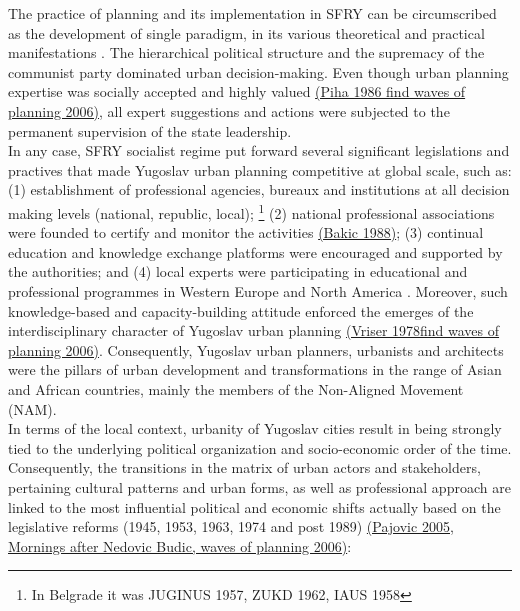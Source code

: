 \documentclass[11pt]{report}
\begin{document}
The practice of planning and its implementation in SFRY can be circumscribed as the development of single paradigm, in its various theoretical and practical manifestations \href{}{\citealt{vukmirovic_city_2013}}.
The hierarchical political structure and the supremacy of the communist party dominated urban decision-making.
Even though urban planning expertise was socially accepted and highly valued \href{}{(Piha 1986 find waves of planning 2006)}, all expert suggestions and actions were subjected to the permanent supervision of the state leadership.
\\
In any case, SFRY socialist regime put forward several significant legislations and practives that made Yugoslav urban planning competitive at global scale, such as: 
(1) establishment of professional agencies, bureaux and institutions at all decision making levels (national, republic, local);
\footnote{In Belgrade it was JUGINUS 1957, ZUKD 1962, IAUS 1958} (2) national professional associations were founded to certify and monitor the activities \href{}{(Bakic 1988)}; (3) continual education and knowledge exchange platforms were encouraged and supported by the authorities; and (4) local experts were participating in educational and professional programmes in Western Europe and North America \href{}{\citealt{nedovicbudic_waves_2006}}.
Moreover, such knowledge-based and capacity-building attitude enforced the emerges of the interdisciplinary character of Yugoslav urban planning \href{}{(Vriser 1978find waves of planning 2006)}.
Consequently, Yugoslav urban planners, urbanists and architects were the pillars of urban development and transformations in the range of Asian and African countries, mainly the members of the Non-Aligned Movement (NAM).
\\

In terms of the local context, urbanity of Yugoslav cities result in being strongly tied to the underlying political organization and socio-economic order of the time.
Consequently, the transitions in the matrix of urban actors and stakeholders, pertaining cultural patterns and urban forms, as well as professional approach are linked to the most influential political and economic shifts actually based on the legislative reforms (1945, 1953, 1963, 1974 and post 1989) \href{}{(Pajovic 2005, Mornings after Nedovic Budic, waves of planning 2006)}:
\end{document}
